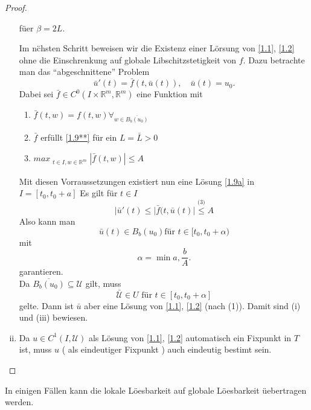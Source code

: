 \documentclass[11pt]{book}
\newcommand{\RR}{\mathbb{R}}
\newcommand{\UU}{\mathcal{U}}
\newcommand{\myTag}[2][]{\tag{#2}\label{#1#2}}
\theoremstyle{break}
\theoremstyle{myStyle}
\begin{document}
\begin{proof}
\begin{enumerate}[(i)]
        f\"uer \( \beta = 2L \).



    Im n\"chsten Schritt beweisen wir die Existenz einer L\"orsung von \eqref{1.1},
    \eqref{1.2} ohne die Einschrenkung auf globale Libschitzstetigkeit von \( f \).
    Dazu betrachte man das ``abgeschnittene'' Problem
    \[ \bar{u}'(t)=\bar{f}(t,\bar{u}(t)), \quad \bar{u}(t) = u_0. \myTag[1.9]{a} \]
    Dabei sei \( \bar{f} \in C^0(I\times \RR^m, \RR^m) \) eine Funktion mit 
    \begin{enumerate}[(1)]
      \item \( \bar{f}(t,w) = f(t,w) \forall_{w\in\overline{B_b(u_0)}} \)
      \item \( \bar{f} \) erf\"ullt \eqref{1.9**} f\"ur ein  \( L = \bar{L} > 0 \)
      \item \( max_{\substack{t \in I, w \in \RR^m}} {|\bar{f}(t,w)|} \leq A \)
    \end{enumerate} 
    Mit diesen Vorraussetzungen existiert nun eine L\"osung \eqref{1.9a} in \(
    I=[t_0,t_0+a] \)
    Es gilt f\"ur \( t \in I \) \[ | \bar{u}'(t) \leq | \bar{f}(t,\bar{u}(t)|
    \stackrel{\text{(3)}}{\leq} A \] Also kann man \[ \bar{u}(t) \in B_b(u_0) \text{
    f\"ur } t \in [t_0,t_0+\alpha) \] mit \[ \alpha = \min{a,\frac{b}{A}}. \]
    garantieren. \\
    Da \( \overline{B_b(u_0)} \subseteq \UU \) gilt, muss \[ \bar{\UU}\in U
    \text{ f\"ur } t \in  [t_0,t_0+\alpha] \] gelte. Dann ist \( \bar{u} \) aber
    eine L\"osung von \eqref{1.1}, \eqref{1.2} (nach (1)). Damit sind (i) und
    (iii) bewiesen.

    \item Da \( u \in C^1(I, \UU) \) als L\"osung von \eqref{1.1}, \eqref{1.2}
      automatisch ein Fixpunkt in \( T \) ist, muss \( u \) ( als eindeutiger Fixpunkt )
      auch eindeutig bestimt sein.
  \end{enumerate}
\end{proof}

In einigen F\"allen kann die lokale L\"oesbarkeit auf globale L\"oesbarkeit
\"uebertragen werden.
\end{document}
